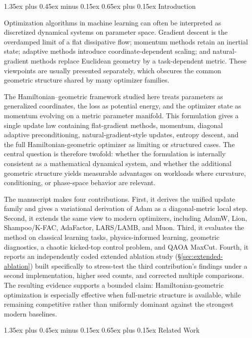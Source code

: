 \documentclass[10pt,twocolumn]{article}
\makeatletter
\renewcommand\section{\@startsection{section}{1}{0pt}%
  {1.35ex plus 0.45ex minus 0.15ex}%
  {0.65ex plus 0.15ex}%
  {\large\bfseries}}
\makeatother
\begin{document}
\section{Introduction}

Optimization algorithms in machine learning can often be interpreted as
discretized dynamical systems on parameter space. Gradient descent is the
overdamped limit of a flat dissipative flow; momentum methods retain an
inertial state; adaptive methods introduce coordinate-dependent scaling; and
natural-gradient methods replace Euclidean geometry by a task-dependent
metric. These viewpoints are usually presented separately, which obscures the
common geometric structure shared by many optimizer families.

The Hamiltonian--geometric framework studied here treats parameters as
generalized coordinates, the loss as potential energy, and the optimizer state
as momentum evolving on a metric parameter manifold. This formulation gives a
single update law containing flat-gradient methods, momentum, diagonal
adaptive preconditioning, natural-gradient-style updates, entropy descent, and
the full Hamiltonian-geometric optimizer as limiting or structured cases. The
central question is therefore twofold: whether the formulation is internally
consistent as a mathematical dynamical system, and whether the additional
geometric structure yields measurable advantages on workloads where curvature,
conditioning, or phase-space behavior are relevant.

The manuscript makes four contributions. First, it derives the unified update
family and gives a variational derivation of Adam as a diagonal-metric local
step. Second, it extends the same view to modern optimizers, including AdamW,
Lion, Shampoo/K-FAC, AdaFactor, LARS/LAMB, and Muon. Third, it evaluates the
method on classical learning tasks, physics-informed learning, geometric
diagnostics, a chaotic kicked-top control problem, and QAOA MaxCut. Fourth,
it reports an independently coded extended ablation study
(\S\ref{sec:extended-ablation}) built specifically to stress-test the third
contribution's findings under a second implementation, higher seed counts,
and corrected multiple comparisons. The resulting evidence supports a
bounded claim: Hamiltonian-geometric optimization is especially effective
when full-metric structure is available, while remaining competitive rather
than uniformly dominant against the
strongest modern baselines.

\section{Related Work}
\label{sec:related-work}
\end{document}

